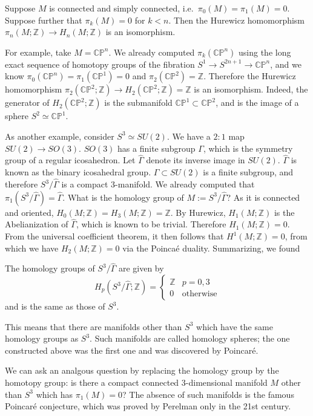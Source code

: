 \documentclass[12pt]{article}
\numberwithin{equation}{section}
\numberwithin{figure}{section}
\theoremstyle{remark}
\def\bZ{\mathbb{Z}}
\def\CP{\mathbb{CP}}
\begin{document}
\begin{theorem}
  Suppose $M$ is connected and simply connected,
  i.e.~$\pi_0(M)=\pi_1(M)=0$.
  Suppose further that $\pi_k(M)=0$ for $k<n$.
  Then the Hurewicz homomorphism $\pi_n(M;\bZ)\to H_n(M;\bZ)$ is an isomorphism.
\end{theorem}

For example, take $M=\CP^n$.
We already computed $\pi_k(\CP^n)$ using the long exact sequence of homotopy groups of the fibration $S^1\to S^{2n+1}\to \CP^n$,
and we know $\pi_{0}(\CP^n)=\pi_1(\CP^1)=0$ and $\pi_2(\CP^2)=\bZ$.
Therefore the Hurewicz homomorphism $\pi_2(\CP^2;\bZ)\to H_2(\CP^2;\bZ)=\bZ$ is an isomorphism.
Indeed, the generator of $H_2(\CP^2;\bZ)$ is the submanifold $\CP^1\subset \CP^2$,
and is the image of a sphere $S^2\simeq \CP^1$.


As another example, consider $S^3\simeq SU(2)$.
We have a $2:1$ map $SU(2)\to SO(3)$.
$SO(3)$ has a finite subgroup $\Gamma$, which is the symmetry group of a regular icosahedron.
Let $\hat\Gamma$ denote its inverse image in $SU(2)$.
$\hat \Gamma$ is known as the binary icosahedral group.
$\hat\Gamma\subset SU(2)$ is a finite subgroup,
and therefore $S^3/\hat\Gamma$ is a compact $3$-manifold.
We already computed that $\pi_1(S^3/\hat\Gamma)=\hat\Gamma$.
What is the homology group of $M:=S^3/\hat\Gamma$?
As it is connected and oriented, $H_0(M;\bZ)=H_3(M;\bZ)=\bZ$.
By Hurewicz, $H_1(M;\bZ)$ is the Abelianization of $\hat\Gamma$,
which is known to be trivial. 
Therefore $H_1(M;\bZ)=0$.
From the universal coefficient theorem, it then follows that $H^1(M;\bZ)=0$,
from which we have $H_2(M;\bZ)=0$ via the Poinca\'e duality.
Summarizing, we found 
\begin{example}
  The homology groups of $S^3/\hat\Gamma$ are given by \begin{equation}
    H_p(S^3/\hat\Gamma;\bZ) = \begin{cases} \bZ & p=0,3 \\ 0 & \text{otherwise} \end{cases}
  \end{equation}
  and is the same as those of $S^3$.
\end{example}
This means that there are manifolds other than $S^3$ which have the same homology groups as $S^3$.
Such manifolds are called homology spheres;
the one constructed above was the first one and was discovered by Poincar\'e.

We can ask an analgous question by replacing the homology group by the homotopy group: 
is there a compact connected 3-dimensional manifold $M$ other than $S^3$ which has $\pi_1(M)=0$?
The absence of such manifolds is the famous Poincar\'e conjecture, 
which was proved by Perelman only in the 21st century.
\end{document}
